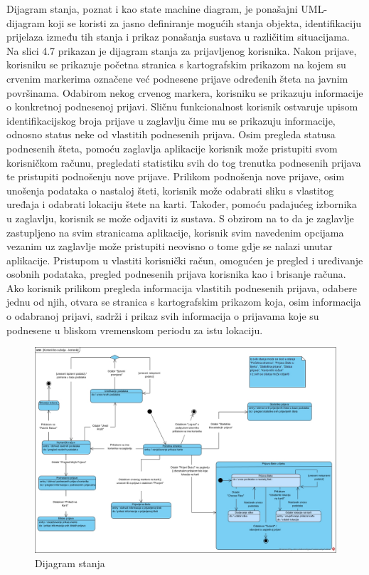 Dijagram stanja, poznat i kao state machine diagram, je ponašajni UML-dijagram koji se koristi za jasno definiranje mogućih stanja objekta, identifikaciju prijelaza između tih stanja i prikaz ponašanja sustava u različitim situacijama.
Na slici 4.7 prikazan je dijagram stanja za prijavljenog korisnika. Nakon prijave, korisniku se prikazuje početna stranica s kartografskim prikazom na kojem su crvenim markerima označene već podnesene prijave određenih šteta na javnim površinama.
Odabirom nekog crvenog markera, korisniku se prikazuju informacije o konkretnoj podnesenoj prijavi. Sličnu funkcionalnost korisnik ostvaruje upisom identifikacijskog broja prijave u zaglavlju čime mu se prikazuju informacije, odnosno status neke od vlastitih podnesenih prijava. Osim pregleda statusa podnesenih šteta, pomoću zaglavlja aplikacije korisnik može pristupiti svom korisničkom računu, pregledati statistiku svih do tog trenutka podnesenih prijava te pristupiti podnošenju nove prijave. Prilikom podnošenja nove prijave, osim unošenja podataka o nastaloj šteti, korisnik može odabrati sliku s vlastitog uređaja i odabrati lokaciju štete na karti. Također, pomoću padajućeg izbornika u zaglavlju, korisnik se može odjaviti iz sustava. S obzirom na to da je zaglavlje zastupljeno na svim stranicama aplikacije, korisnik svim navedenim opcijama vezanim uz zaglavlje može pristupiti neovisno o tome gdje se nalazi unutar aplikacije. Pristupom u vlastiti korisnički račun, omogućen je pregled i uređivanje osobnih podataka, pregled podnesenih prijava korisnika kao i brisanje računa.
Ako korisnik prilikom pregleda informacija vlastitih podnesenih prijava, odabere jednu od njih, otvara se stranica s kartografskim prikazom koja, osim informacija o odabranoj prijavi, sadrži i prikaz svih informacija o prijavama koje su podnesene u bliskom vremenskom periodu za istu lokaciju.
\begin{figure}[H]
	\includegraphics[scale=0.45]{slike/DS.jpg} %
	\centering
	\caption{Dijagram stanja}
	\label{fig:DijagramStanja}
\end{figure}

